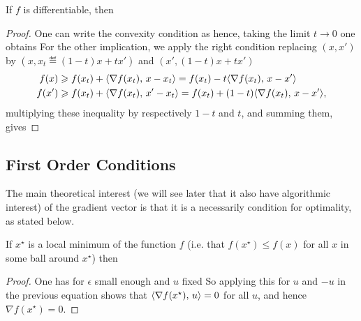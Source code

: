\begin{prop}\label{prop-above-tgt}
	If $f$ is differentiable, then
\end{prop}
\begin{proof}
	One can write the convexity condition as
	hence, taking the limit $t \rightarrow 0$ one obtains
	For the other implication, we apply the right condition replacing $(x,x')$ by $(x, x_t \eqdef (1-t)x+t x')$
	and $(x', (1-t)x+t x')$
	\begin{align*}
		f(x)  & \geqslant f(x_t) + \langle \nabla f(x_t),\,x-x_t\rangle = f(x_t) - t \langle \nabla f(x_t),\,x-x'\rangle \\
		f(x') & \geqslant f(x_t) + \langle \nabla f(x_t),\,x'-x_t\rangle = f(x_t) + (1-t) \langle \nabla f(x_t),\,x-x'\rangle, 
	\end{align*}
	multiplying these inequality by respectively $1-t$ and $t$, and summing them, gives
\end{proof}


\subsection{First Order Conditions}

The main theoretical interest (we will see later that it also have algorithmic interest) of the gradient vector is that it is a necessarily condition for optimality, as stated below. 

\begin{prop}\label{prop-cs-min} 
If $x^\star$ is a local minimum of the function $f$ (i.e. that $f(x^\star) \leq f(x)$ for all $x$ in some ball around $x^\star$) then 
\end{prop}
\begin{proof}
One has for $\epsilon$ small enough and $u$ fixed 
So applying this for $u$ and $-u$ in the previous equation shows that $\langle \nabla f(x^\star),\,u\rangle=0$ for all $u$, and hence $\nabla f(x^\star)=0$.
\end{proof}

